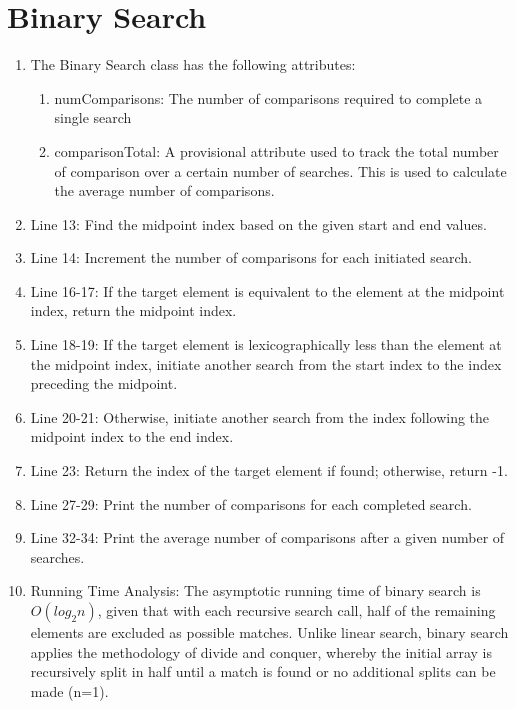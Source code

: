 \documentclass[letterpaper, 10pt,DIV=13]{scrartcl}
\numberwithin{equation}{section} %
\numberwithin{figure}{section} %
\numberwithin{table}{section} %
\begin{document}
\section{Binary Search}
\begin{enumerate}
    \item The Binary Search class has the following attributes:
    \begin{enumerate}
        \item numComparisons: The number of comparisons required to complete a single search
        \item comparisonTotal: A provisional attribute used to track the total number of comparison over a certain number of searches. This is used to calculate the average number of comparisons. 
    \end{enumerate}
    \item Line 13: Find the midpoint index based on the given start and end values.
    \item Line 14: Increment the number of comparisons for each initiated search.
    \item Line 16-17: If the target element is equivalent to the element at the midpoint index, return the midpoint index.
    \item Line 18-19: If the target element is lexicographically less than the element at the midpoint index, initiate another search from the start index to the index preceding the midpoint.
    \item Line 20-21: Otherwise, initiate another search from the index following the midpoint index to the end index.
    \item Line 23: Return the index of the target element if found; otherwise, return -1.
    \item Line 27-29: Print the number of comparisons for each completed search.
    \item Line 32-34: Print the average number of comparisons after a given number of searches.
    \item Running Time Analysis: The asymptotic running time of binary search is $O(log_2n)$, given that with each recursive search call, half of the remaining elements are excluded as possible matches. Unlike linear search, binary search applies the methodology of divide and conquer, whereby the initial array is recursively split in half until a match is found or no additional splits can be made (n=1). 
\end{enumerate}
\end{document}
